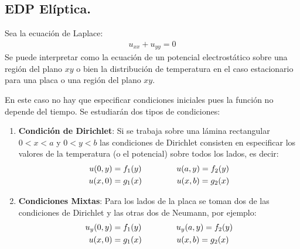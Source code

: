 \subsection{EDP Elíptica.}
Sea la ecuación de Laplace:
\begin{align*}
u_{xx} + u_{yy} = 0
\end{align*}
Se puede interpretar como la ecuación de un potencial electrostático sobre una región del plano $xy$ o bien la distribución de temperatura en el caso estacionario para una placa o una región del plano $xy$.
\par
En este caso no hay que especificar condiciones iniciales pues la función no depende del tiempo. Se estudiarán dos tipos de condiciones:
\begin{enumerate}
\item \textbf{Condición de Dirichlet}: Si se trabaja sobre una lámina rectangular $0 < x < a$ y $0 < y < b$ las condiciones de Dirichlet consisten en especificar los valores de la temperatura (o el potencial) sobre todos los lados, es decir:
\begin{align}
\begin{aligned}
u(0, y) &= f_{1}(y) \hspace{1.5cm} u(a, y) = f_{2}(y) \\
u(x, 0) &= g_{1}(x) \hspace{1.5cm} u(x, b) = g_{2}(x)
\end{aligned}
\label{eq:ecuacion_06_02_05}
\end{align}
\item \textbf{Condiciones Mixtas}: Para los lados de la placa se toman dos de las condiciones de Dirichlet y las otras dos de Neumann, por ejemplo:
\begin{align}
\begin{aligned}
u_{y}(0, y) &= f_{1}(y) \hspace{1.5cm} u_{y}(a, y) = f_{2}(y) \\
u(x, 0) &= g_{1}(x) \hspace{1.5cm} u(x, b) = g_{2}(x)
\end{aligned}
\label{eq:ecuacion_06_01_06}
\end{align}
\end{enumerate}
